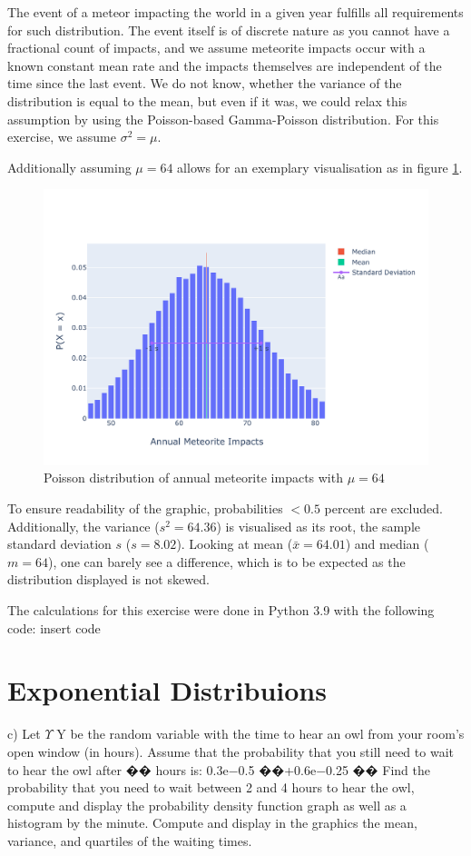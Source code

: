 The event of a meteor impacting the world in a given year fulfills all requirements for such distribution. The event itself is of discrete nature as you cannot have a fractional count of impacts, and we assume meteorite impacts occur with a known constant mean rate and the impacts themselves are independent of the time since the last event. We do not know, whether the variance of the distribution is equal to the mean, but even if it was, we could relax this assumption by using the Poisson-based Gamma-Poisson distribution. For this exercise, we assume $\sigma^2 = \mu$. 

Additionally assuming $\mu = 64$ allows for an exemplary visualisation as in figure \ref{fig:1b}.

\begin{figure}[h]
\centering
\includegraphics[width=16cm]{pics/1b.pdf}
\caption{Poisson distribution of annual meteorite impacts with $\mu = 64$}
\label{fig:1b}
\end{figure}
\FloatBarrier

To ensure readability of the graphic, probabilities $<0.5$ percent are excluded. Additionally, the variance ($s^2 = 64.36$) is visualised as its root, the sample standard deviation $s$ ($s = 8.02$). Looking at mean ($\bar{x} = 64.01$) and median ($m = 64$), one can barely see a difference, which is to be expected as the distribution displayed is not skewed. 

The calculations for this exercise were done in Python 3.9 with the following code: 
insert code 

\section{Exponential Distribuions}
c) Let $\Upsilon$ Y be the random variable with the time to hear an owl from your room’s open window (in hours). Assume that the probability that you still need to wait to hear the owl after �� hours is:
0.3e−0.5 ��+0.6e−0.25 ��
Find the probability that you need to wait between 2 and 4 hours to hear the owl, compute and display the probability density function graph as well as a histogram by the minute. Compute and display in the graphics the mean, variance, and quartiles of the waiting times.

